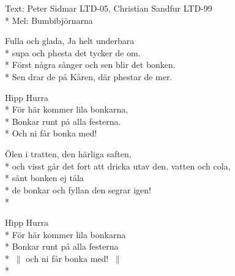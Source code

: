 \begin{SongText}[Bonksången]
    \begin{SongInfo}
        Text: Peter Sidmar LTD-05, Christian Sandfur LTD-99\\*%
        Mel: Bumbibjörnarna
    \end{SongInfo}
    \begin{Verse}
        Fulla och glada, Ja helt underbara\\*%
        supa och phesta det tycker de om.\\*%
        Först några sånger och sen blir det bonken.\\*%
        Sen drar de på Kåren, där phestar de mer.
    \end{Verse}
    \begin{Verse}
        Hipp Hurra\\*%
        För här kommer lila bonkarna,\\*%
        Bonkar runt på alla festerna.\\*%
        Och ni får bonka med!
    \end{Verse}
    \begin{Verse}
        Ölen i tratten, den härliga saften,\\*%
        och visst går det fort att dricka utav den.
        vatten och cola,\\*%
        sånt bonken ej tåla\\*%
        de bonkar och fyllan den segrar igen!\\*%
    \end{Verse}
    \begin{Verse}
        Hipp Hurra\\*%
        För här kommer lila bonkarna\\*%
        Bonkar runt på alla festerna\\*%
        $\:\|$ och ni får bonka med! $\:\|$\\*%
    \end{Verse}
\end{SongText}

